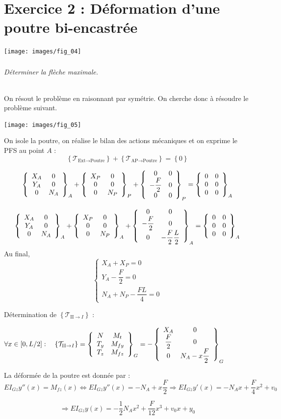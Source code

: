 \documentclass[10pt,fleqn]{article} %
\begin{document}
\section*{Exercice 2 : Déformation d'une poutre bi-encastrée}

\begin{center}
\texttt{[image: images/fig\_04]}
\end{center}

\setcounter{subparagraph}{0}
\subparagraph{}
\textit{Déterminer la flèche maximale.}
\ifprof
\begin{corrige}
~\\
On résout le problème en raisonnant par symétrie. On cherche donc à résoudre le problème suivant.
\begin{center}
\texttt{[image: images/fig\_05]}
\end{center}

On isole la poutre, on réalise le bilan des actions mécaniques et on exprime le PFS au point $A$ :
$$
\left\{\mathcal{T}_{\text{Ext} \rightarrow \text{Poutre}}  \right\} + 
\left\{\mathcal{T}_{\text{AP} \rightarrow \text{Poutre}}  \right\} =
\left\{0 \right\} 
$$ 


$$
\torseurcol{X_A}{Y_A}{0}{0}{0}{N_A}{A} + 
\torseurcol{X_P}{0}{0}{0}{0}{N_P}{P} + 
\torseurcol{0}{-\dfrac{F}{2}}{0}{0}{0}{0}{P} =  
\torseurcol{0}{0}{0}{0}{0}{0}{A}
$$


$$
\torseurcol{X_A}{Y_A}{0}{0}{0}{N_A}{A} + 
\torseurcol{X_P}{0}{0}{0}{0}{N_P}{A} + 
\torseurcol{0}{-\dfrac{F}{2}}{0}{0}{0}{-\dfrac{F}{2}\dfrac{L}{2}}{A} =  
\torseurcol{0}{0}{0}{0}{0}{0}{A}
$$
Au final, 
$$
\left\{
\begin{array}{l}
X_A +X_P= 0\\
Y_A - \dfrac{F}{2}= 0 \\
N_A + N_P -\dfrac{FL}{4} = 0
\end{array}
\right.
$$


Détermination de $ \left\{\mathcal{T}_{\text{II}\rightarrow I}\right\}$ :

$
\forall x \in [0,L/2] : \quad 
\left\{\mathcal{T}_{\text{II}\rightarrow I}\right\} 
= \torseurcol{N}{T_y}{T_z}{M_t}{M_{fy}}{M_{fz}}{G}
= -  \torseurcol{X_A}{\dfrac{F}{2}}{0}{0}{0}{N_A-x\dfrac{F}{2}}{G} 
$


La déformée de la poutre est donnée par : 
$$
EI_{Gz}y''(x) = M_{fz}(x) 
\Longleftrightarrow EI_{Gz}y''(x) = -N_A+x\dfrac{F}{2}
\Rightarrow EI_{Gz}y'(x) = -N_Ax+\dfrac{F}{4}x^2 + v_0
$$

$$ \Rightarrow EI_{Gz}y(x) = -\dfrac{1}{2}N_Ax^2+\dfrac{F}{12}x^3 + v_0x + y_0 $$


\end{corrige}
\end{document}

